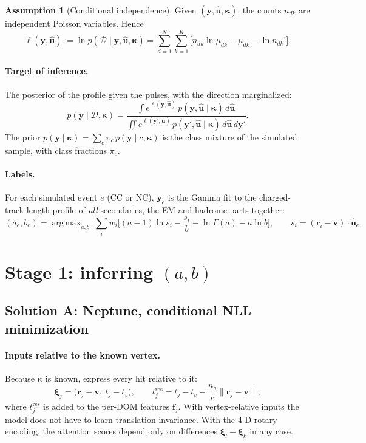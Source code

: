 \documentclass[11pt]{article}
\theoremstyle{definition}
\newtheorem{assumption}{Assumption}
\newcommand{\D}{\mathcal{D}}
\newcommand{\y}{\bm{y}}
\DeclareMathOperator*{\argmax}{arg\,max}
\begin{document}
\begin{assumption}[Conditional independence]
Given $(\y,\hat{\bm u},\bm\kappa)$, the counts $n_{dk}$ are independent Poisson variables.
Hence
\begin{equation}
  \ell(\y,\hat{\bm u}) := \ln p(\D\mid\y,\hat{\bm u},\bm\kappa)
  = \sum_{d=1}^{N}\sum_{k=1}^{K}\big[n_{dk}\ln\mu_{dk} - \mu_{dk} - \ln n_{dk}!\big].
  \label{eq:loglik}
\end{equation}
\end{assumption}

\paragraph{Target of inference.}
The posterior of the profile given the pulses, with the direction marginalized:
\begin{equation}
  p(\y\mid\D,\bm\kappa) = \frac{\int e^{\ell(\y,\hat{\bm u})}\,p(\y,\hat{\bm u}\mid\bm\kappa)\,d\hat{\bm u}}
  {\iint e^{\ell(\y',\hat{\bm u})}\,p(\y',\hat{\bm u}\mid\bm\kappa)\,d\hat{\bm u}\,d\y'} .
  \label{eq:post}
\end{equation}
The prior $p(\y\mid\bm\kappa) = \sum_c \pi_c\,p(\y\mid c,\bm\kappa)$ is the class mixture of the
simulated sample, with class fractions $\pi_c$.

\paragraph{Labels.}
For each simulated event $e$ (CC or NC), $\y_e$ is the Gamma fit to the charged-track-length
profile of \emph{all} secondaries, the EM and hadronic parts together:
\begin{equation}
  (a_e,b_e) = \argmax_{a,b}\ \sum_i w_i\Big[(a-1)\ln s_i - \frac{s_i}{b} - \ln\Gamma(a) - a\ln b\Big],
  \qquad s_i = (\bm r_i - \bm v)\cdot\hat{\bm u}_e .
\end{equation}

\section{Stage 1: inferring $(a,b)$}

\subsection{Solution A: Neptune, conditional NLL minimization}

\paragraph{Inputs relative to the known vertex.}
Because $\bm\kappa$ is known, express every hit relative to it:
\begin{equation}
  \bm\xi_j = \big(\bm r_j-\bm v,\ t_j - t_v\big),\qquad
  t^{\text{res}}_j = t_j - t_v - \frac{n_g}{c}\|\bm r_j - \bm v\|,
\end{equation}
where $t^{\text{res}}_j$ is added to the per-DOM features $\bm f_j$. With vertex-relative inputs
the model does not have to learn translation invariance. With the 4-D rotary encoding, the
attention scores depend only on differences $\bm\xi_l - \bm\xi_k$ in any case.
\end{document}
